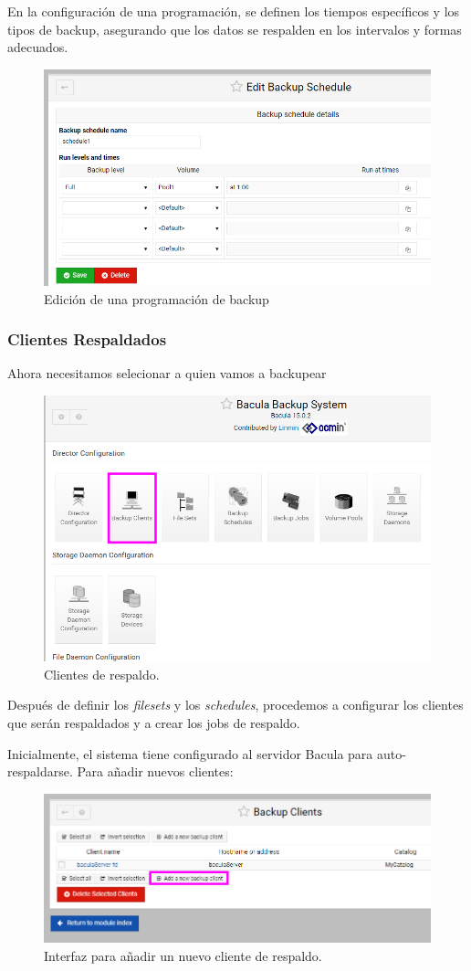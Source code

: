 En la configuración de una programación, se definen los tiempos específicos y los tipos de backup, asegurando que los datos se respalden en los intervalos y formas adecuados.

\begin{figure}[H]
    \centering
    \includegraphics[width=0.5\linewidth]{instalacionBacula/editbuckupschedule.png}
    \caption{Edición de una programación de backup}
\end{figure}






\subsubsection{Clientes Respaldados}

Ahora necesitamos selecionar a quien vamos a backupear
\begin{figure}[H]
    \centering
    \includegraphics[width=0.5\linewidth]{instalacionBacula/asdasdas.png}
    \caption{Clientes de respaldo.}
\end{figure}

Después de definir los \textit{filesets} y los \textit{schedules}, procedemos a configurar los clientes que serán respaldados y a crear los jobs de respaldo.


Inicialmente, el sistema tiene configurado al servidor Bacula para auto-respaldarse. Para añadir nuevos clientes:

\begin{figure}[H]
    \centering
    \includegraphics[width=0.5\linewidth]{instalacionBacula/addnewbuckupclient.png}
    \caption{Interfaz para añadir un nuevo cliente de respaldo.}
\end{figure}

